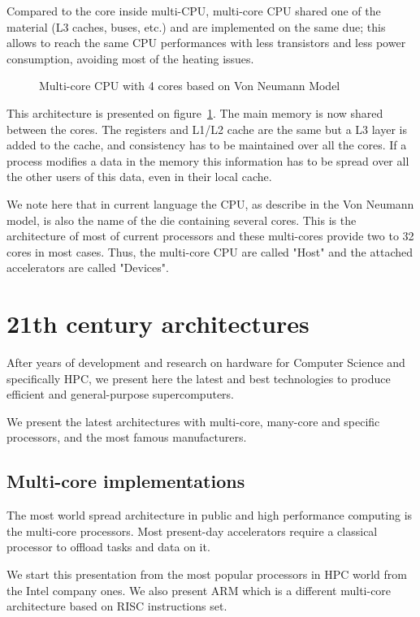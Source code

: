 Compared to the core inside multi-CPU, multi-core CPU shared one of the material (L3 caches, buses, etc.) and are implemented on the same due; this allows to reach the same CPU performances with less transistors and less power consumption, avoiding most of the heating issues. 

\begin{figure}
\centering 

\caption{Multi-core CPU with 4 cores based on Von Neumann Model}
\label{fig:2_HARD:von_neumann_model_multi-core}
\end{figure}

This architecture is presented on figure~\ref{fig:2_HARD:von_neumann_model_multi-core}.
The main memory is now shared between the cores. 
The registers and L1/L2 cache are the same but a L3 layer is added to the cache, and consistency has to be maintained over all the cores. 
If a process modifies a data in the memory this information has to be spread over all the other users of this data, even in their local cache. 

We note here that in current language the CPU, as describe in the Von Neumann model, is also the name of the die containing several cores. 
This is the architecture of most of current processors and these multi-cores provide two to 32 cores in most cases. 
Thus, the multi-core CPU are called "Host" and the attached accelerators are called "Devices".

\section{21th century architectures}
After years of development and research on hardware for Computer Science and specifically HPC, we present here the latest and best technologies to produce efficient and general-purpose supercomputers.

We present the latest architectures with multi-core, many-core and specific processors, and the most famous manufacturers. 

\subsection{Multi-core implementations}
The most world spread architecture in public and high performance computing is the multi-core processors. 
Most present-day accelerators require a classical processor to offload tasks and data on it. 

We start this presentation from the most popular processors in HPC world from the Intel company ones. 
We also present ARM which is a different multi-core architecture based on RISC instructions set.

